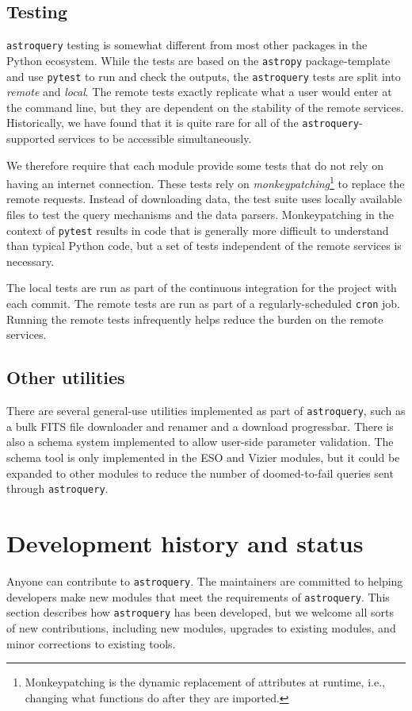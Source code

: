 \documentclass[twocolumn]{aastex62}
\newcommand{\package}[1]{\texttt{#1}\xspace}
\newcommand{\astroquery}{\package{astroquery}}
\newcommand{\astropypkg}{\package{astropy}}
\begin{document}
\subsection{Testing}
\astroquery testing is somewhat different from most other packages in the Python
ecosystem.  While the tests are based on the \astropypkg package-template and use
\package{pytest} to run and check the outputs, the \astroquery tests are split into
\emph{remote} and \emph{local}.  The remote tests exactly replicate what a user
would enter at the command line, but they are dependent on the stability of the
remote services.  Historically, we have found that it is quite rare for all of
the \astroquery-supported services to be accessible simultaneously.

We therefore require that each module provide some tests that do not rely on
having an internet connection.  These tests rely on
\emph{monkeypatching}\footnote{Monkeypatching is the dynamic replacement of
attributes at runtime, i.e., changing what functions do after they are
imported.} to
replace the remote requests. Instead of downloading data, the test suite uses
locally available files to test the query mechanisms and the data parsers.
Monkeypatching in the context of
\package{pytest} results in code that is generally more difficult to understand
than typical Python code, but a set of tests independent of the remote services
is necessary.

The local tests are run as part of the continuous integration for the
project with each commit.  The remote tests are run as part of a
regularly-scheduled \texttt{cron} job.  Running the remote tests infrequently
helps reduce the burden on the remote services.

\subsection{Other utilities}
There are several general-use utilities implemented as part of \astroquery, such
as a bulk FITS file downloader and renamer and a download progressbar.  There
is also a schema system implemented to allow user-side parameter validation.
The schema tool is only implemented in the ESO and Vizier modules, but it could
be expanded to other modules to reduce the number of doomed-to-fail queries
sent through \astroquery.

\section{Development history and status}
\label{sec:development}
Anyone can contribute to \astroquery.  The maintainers are committed to helping
developers make new modules that meet the requirements of \astroquery.  This
section describes how \astroquery has been developed, but we welcome all sorts
of new contributions, including new modules, upgrades to existing modules, and
minor corrections to existing tools.
\end{document}
